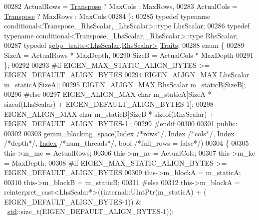 \begin{DoxyCode}
00282       ActualRows = \hyperlink{group___core___module_class_eigen_1_1_transpose}{Transpose} ? MaxCols : MaxRows,
00283       ActualCols = \hyperlink{group___core___module_class_eigen_1_1_transpose}{Transpose} ? MaxRows : MaxCols
00284     \};
00285     \textcolor{keyword}{typedef} \textcolor{keyword}{typename} conditional<Transpose,\_RhsScalar,\_LhsScalar>::type LhsScalar;
00286     \textcolor{keyword}{typedef} \textcolor{keyword}{typename} conditional<Transpose,\_LhsScalar,\_RhsScalar>::type RhsScalar;
00287     \textcolor{keyword}{typedef} \hyperlink{class_eigen_1_1internal_1_1gebp__traits}{gebp\_traits<LhsScalar,RhsScalar>} 
      \hyperlink{class_eigen_1_1internal_1_1gebp__traits}{Traits};
00288     \textcolor{keyword}{enum} \{
00289       SizeA = ActualRows * MaxDepth,
00290       SizeB = ActualCols * MaxDepth
00291     \};
00292 
00293 \textcolor{preprocessor}{#if EIGEN\_MAX\_STATIC\_ALIGN\_BYTES >= EIGEN\_DEFAULT\_ALIGN\_BYTES}
00294     EIGEN\_ALIGN\_MAX LhsScalar m\_staticA[SizeA];
00295     EIGEN\_ALIGN\_MAX RhsScalar m\_staticB[SizeB];
00296 \textcolor{preprocessor}{#else}
00297     EIGEN\_ALIGN\_MAX \textcolor{keywordtype}{char} m\_staticA[SizeA * \textcolor{keyword}{sizeof}(LhsScalar) + EIGEN\_DEFAULT\_ALIGN\_BYTES-1];
00298     EIGEN\_ALIGN\_MAX \textcolor{keywordtype}{char} m\_staticB[SizeB * \textcolor{keyword}{sizeof}(RhsScalar) + EIGEN\_DEFAULT\_ALIGN\_BYTES-1];
00299 \textcolor{preprocessor}{#endif}
00300 
00301   \textcolor{keyword}{public}:
00302 
00303     \hyperlink{class_eigen_1_1internal_1_1gemm__blocking__space}{gemm\_blocking\_space}(\hyperlink{namespace_eigen_a62e77e0933482dafde8fe197d9a2cfde}{Index} \textcolor{comment}{/*rows*/}, \hyperlink{namespace_eigen_a62e77e0933482dafde8fe197d9a2cfde}{Index} \textcolor{comment}{/*cols*/}, 
      \hyperlink{namespace_eigen_a62e77e0933482dafde8fe197d9a2cfde}{Index} \textcolor{comment}{/*depth*/}, \hyperlink{namespace_eigen_a62e77e0933482dafde8fe197d9a2cfde}{Index} \textcolor{comment}{/*num\_threads*/}, \textcolor{keywordtype}{bool} \textcolor{comment}{/*full\_rows = false*/})
00304     \{
00305       this->m\_mc = ActualRows;
00306       this->m\_nc = ActualCols;
00307       this->m\_kc = MaxDepth;
00308 \textcolor{preprocessor}{#if EIGEN\_MAX\_STATIC\_ALIGN\_BYTES >= EIGEN\_DEFAULT\_ALIGN\_BYTES}
00309       this->m\_blockA = m\_staticA;
00310       this->m\_blockB = m\_staticB;
00311 \textcolor{preprocessor}{#else}
00312       this->m\_blockA = \textcolor{keyword}{reinterpret\_cast<}LhsScalar*\textcolor{keyword}{>}((internal::UIntPtr(m\_staticA) + (
      EIGEN\_DEFAULT\_ALIGN\_BYTES-1)) & ~\hyperlink{namespacestd}{std}::size\_t(EIGEN\_DEFAULT\_ALIGN\_BYTES-1));

\end{DoxyCode}
